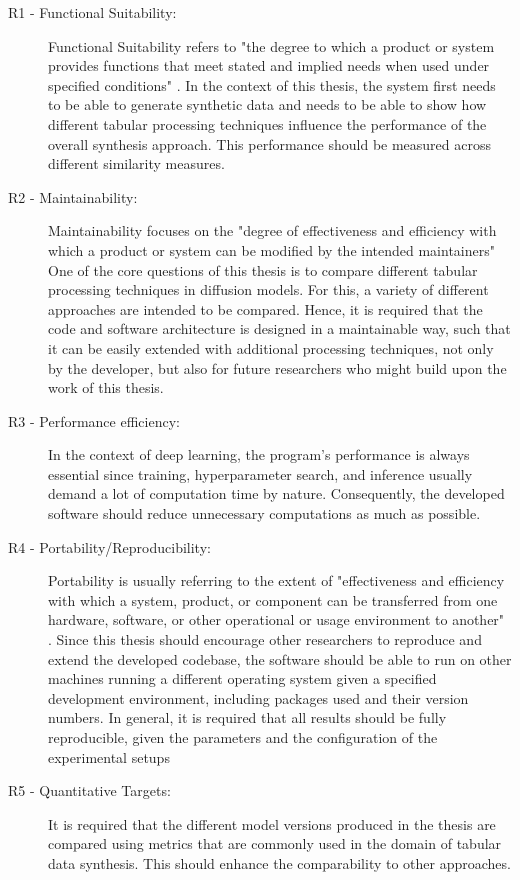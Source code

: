 \begin{description}
	\item[R1 - Functional Suitability:]
		Functional Suitability refers to "the degree to which a product or system provides functions that meet stated and implied needs when used under specified conditions" \cite[p. 219]{bass2013SoftwareArchitecturePractice}.
		In the context of this thesis, the system first needs to be able to generate synthetic data and needs to be able to show how different tabular processing techniques influence the performance of the overall synthesis approach.
		This performance should be measured across different similarity measures.

	\item[R2 - Maintainability:]
		Maintainability focuses on the "degree of effectiveness and efficiency with which a product or system can be modified by the intended maintainers" \cite[p. 220]{bass2013SoftwareArchitecturePractice}
		One of the core questions of this thesis is to compare different tabular processing techniques in diffusion models.
		For this, a variety of different approaches are intended to be compared.
		Hence, it is required that the code and software architecture is designed in a maintainable way, such that it can be easily extended with additional processing techniques, not only by the developer,
		but also for future researchers who might build upon the work of this thesis.

	\item[R3 - Performance efficiency:]
		In the context of deep learning, the program's performance is always essential since training, hyperparameter search, and inference usually demand a lot of computation time by nature.
		Consequently, the developed software should reduce unnecessary computations as much as possible.

	\item[R4 - Portability/Reproducibility:]
		Portability is usually referring to the extent of "effectiveness and efficiency with which a system, product, or component can be transferred from one hardware, software,
		or other operational or usage environment to another" \cite[p. 220]{bass2013SoftwareArchitecturePractice}.
		Since this thesis should encourage other researchers to reproduce and extend the developed codebase, the software should be able to run on other machines running a different operating system given a specified development environment,
		including packages used and their version numbers.
		In general, it is required that all results should be fully reproducible, given the parameters and the configuration of the experimental setups

	\item[R5 - Quantitative Targets:]
		It is required that the different model versions produced in the thesis are compared using metrics that are commonly used in the domain of tabular data synthesis.
		This should enhance the comparability to other approaches.
\end{description}


